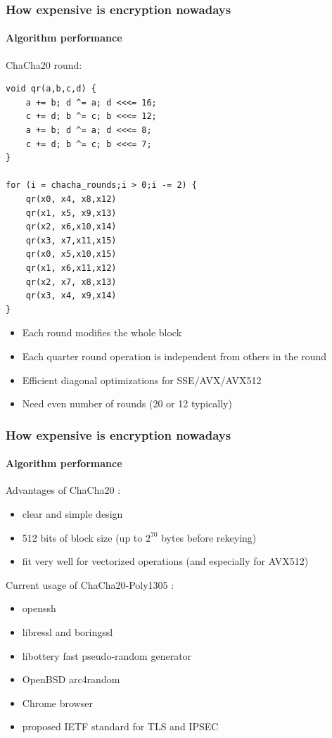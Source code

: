 \documentclass[12pt,t]{beamer}
\newcommand{\funcname}[1]{
	{\color{yellow!30} #1}
}
\newcommand{\cipher}[1]{
	{\color{blue!30} #1}
}
\begin{document}
\begin{frame}[fragile]
\frametitle{How expensive is encryption nowadays}
\framesubtitle{Algorithm performance} 
\cipher{ChaCha20} round:
\begin{tiny}
\begin{verbatim}
void qr(a,b,c,d) {
    a += b; d ^= a; d <<<= 16;
    c += d; b ^= c; b <<<= 12;
    a += b; d ^= a; d <<<= 8;
    c += d; b ^= c; b <<<= 7;
}

for (i = chacha_rounds;i > 0;i -= 2) {
    qr(x0, x4, x8,x12)
    qr(x1, x5, x9,x13)
    qr(x2, x6,x10,x14)
    qr(x3, x7,x11,x15)
    qr(x0, x5,x10,x15)
    qr(x1, x6,x11,x12)
    qr(x2, x7, x8,x13)
    qr(x3, x4, x9,x14)
}
\end{verbatim}
\end{tiny}
\begin{itemize}
\item<2-> Each round modifies the whole block
\item<2-> Each quarter round operation is independent from others in the round
\item<2-> Efficient diagonal optimizations for SSE/AVX/AVX512
\item<2-> Need even number of rounds (20 or 12 typically)
\end{itemize}
\end{frame}

\begin{frame}
\frametitle{How expensive is encryption nowadays}
\framesubtitle{Algorithm performance} 
Advantages of \cipher{ChaCha20}:
\begin{itemize}
\item clear and simple design
\item 512 bits of block size (up to $2^{70}$ bytes before rekeying)
\item fit very well for vectorized operations (and especially for AVX512)
\end{itemize}
Current usage of \cipher{ChaCha20-Poly1305}:
\begin{itemize}
\item openssh
\item libressl and boringssl
\item libottery fast pseudo-random generator
\item OpenBSD \funcname{arc4random}
\item Chrome browser
\item proposed IETF standard for TLS and IPSEC
\end{itemize}
\end{frame}
\end{document}
